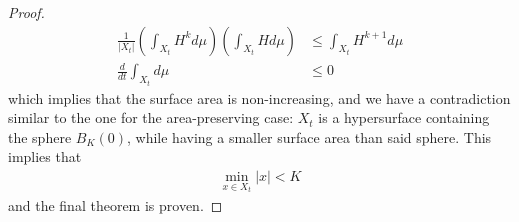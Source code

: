 \begin{proof}
\begin{align*}
		\frac{1}{|X_t|} \left(\int_{X_t}  H^{k} d\mu\right) \left(\int_{X_t}  H d\mu\right)&\leq \int_{X_t}  H^{k+1} d\mu\\
		\frac{d}{d t}\int_{X_t} d\mu &\leq 0
	\end{align*}
	which implies that the surface area is non-increasing, and we have a contradiction similar to the one for the area-preserving case: $X_t$ is a hypersurface containing the sphere $B_K(0)$, while having a smaller surface area than said sphere. This implies that 
	\begin{align*}
		\min_{x\in X_t} |x| < K
	\end{align*}
	and the final theorem is proven. 
\end{proof}


